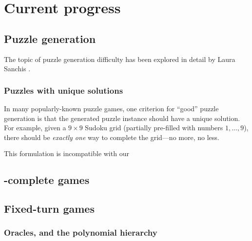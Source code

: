 \chapter{Current progress}

\label{ch:progress}

\section{Puzzle generation}

\label{sec:progress.generation}

The topic of puzzle generation difficulty has been explored in detail by Laura
Sanchis
\parencite{language-instances,test-gen-complexity,hard-diverse-graph-tests}.


\subsection{Puzzles with unique solutions}

In many popularly-known puzzle games, one criterion for ``good'' puzzle
generation is that the generated puzzle instance should have a unique solution.
For example, given a \(9\times9\) Sudoku grid (partially pre-filled with
numbers \(1,\dotsc,9\)), there should be \emph{exactly one} way to complete the
grid---no more, no less.

This formulation is incompatible with our

\section{\PSPACE-complete games}

\label{sec:progress.pspace}


\section{Fixed-turn games}

\label{sec:progress.ph}

\subsection{Oracles, and the polynomial hierarchy}


